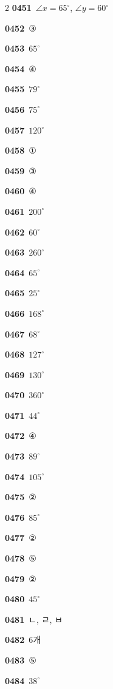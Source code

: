 \documentclass[10pt,a4paper]{article}
\begin{document}
\begin{multicols}{2}
\noindent\textbf{0451}\ $\angle x=65^\circ$, $\angle y=60^\circ$\par
\noindent\textbf{0452}\ ③\par
\noindent\textbf{0453}\ $65^\circ$\par
\noindent\textbf{0454}\ ④\par
\noindent\textbf{0455}\ $79^\circ$\par
\noindent\textbf{0456}\ $75^\circ$\par
\noindent\textbf{0457}\ $120^\circ$\par
\noindent\textbf{0458}\ ①\par
\noindent\textbf{0459}\ ③\par
\noindent\textbf{0460}\ ④\par
\noindent\textbf{0461}\ $200^\circ$\par
\noindent\textbf{0462}\ $60^\circ$\par
\noindent\textbf{0463}\ $260^\circ$\par
\noindent\textbf{0464}\ $65^\circ$\par
\noindent\textbf{0465}\ $25^\circ$\par
\noindent\textbf{0466}\ $168^\circ$\par
\noindent\textbf{0467}\ $68^\circ$\par
\noindent\textbf{0468}\ $127^\circ$\par
\noindent\textbf{0469}\ $130^\circ$\par
\noindent\textbf{0470}\ $360^\circ$\par
\noindent\textbf{0471}\ $44^\circ$\par
\noindent\textbf{0472}\ ④\par
\noindent\textbf{0473}\ $89^\circ$\par
\noindent\textbf{0474}\ $105^\circ$\par
\noindent\textbf{0475}\ ②\par
\noindent\textbf{0476}\ $85^\circ$\par
\noindent\textbf{0477}\ ②\par
\noindent\textbf{0478}\ ⑤\par
\noindent\textbf{0479}\ ②\par
\noindent\textbf{0480}\ $45^\circ$\par
\noindent\textbf{0481}\ ㄴ, ㄹ, ㅂ\par
\noindent\textbf{0482}\ 6개\par
\noindent\textbf{0483}\ ⑤\par
\noindent\textbf{0484}\ $38^\circ$\par

\end{multicols}
\end{document}

